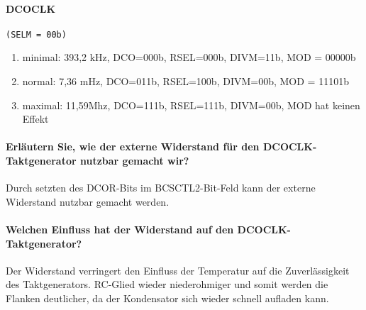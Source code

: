 \paragraph{DCOCLK} \texttt{(SELM = 00b)}
\begin{enumerate}
    \item minimal: 393,2 kHz, DCO=000b, RSEL=000b, DIVM=11b, MOD = 00000b
    \item normal: 7,36 mHz, DCO=011b, RSEL=100b, DIVM=00b, MOD = 11101b
    \item maximal: 11,59Mhz, DCO=111b, RSEL=111b, DIVM=00b, MOD hat keinen Effekt
\end{enumerate}

\paragraph{Erläutern Sie, wie der externe Widerstand für den DCOCLK-Taktgenerator nutzbar gemacht wir?}
Durch setzten des DCOR-Bits im BCSCTL2-Bit-Feld kann der externe Widerstand nutzbar gemacht werden.

\paragraph{Welchen Einfluss hat der Widerstand auf den DCOCLK-Taktgenerator?}
Der Widerstand verringert den Einfluss der Temperatur auf die Zuverlässigkeit des Taktgenerators. RC-Glied wieder niederohmiger und somit werden die Flanken deutlicher, da der Kondensator sich wieder schnell aufladen kann.

